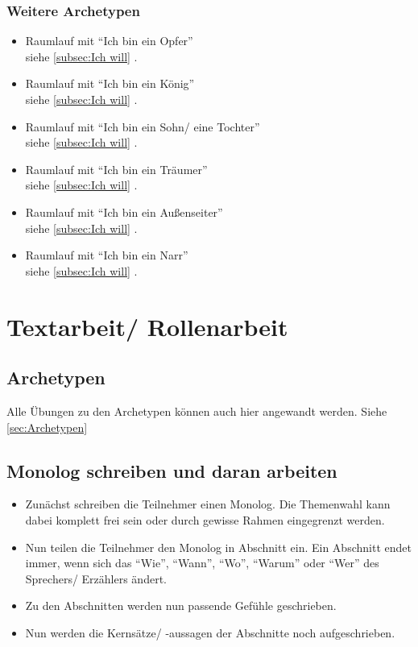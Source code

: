 \documentclass[ngerman, a4paper, twoside]{scrbook}%
\begin{document}
	\subsubsection{Weitere Archetypen}
	\begin{itemize}
		\item Raumlauf mit "`Ich bin ein Opfer"'\\
			siehe \ref{subsec:Ich will} .
		\item Raumlauf mit "`Ich bin ein König"'\\
		siehe \ref{subsec:Ich will} .
		\item Raumlauf mit "`Ich bin ein Sohn/ eine Tochter"'\\
			siehe \ref{subsec:Ich will} .
		\item Raumlauf mit "`Ich bin ein Träumer"'\\
			siehe \ref{subsec:Ich will} .
		\item Raumlauf mit "`Ich bin ein Außenseiter"'\\
			siehe \ref{subsec:Ich will} .
		\item Raumlauf mit "`Ich bin ein Narr"'\\
			siehe \ref{subsec:Ich will} .
	\end{itemize}




	\section{Textarbeit/ Rollenarbeit}
	\subsection{Archetypen}
	Alle Übungen zu den Archetypen können auch hier angewandt werden. Siehe \ref{sec:Archetypen} 
	\subsection{Monolog schreiben und daran arbeiten}
	\begin{itemize}
		\item Zunächst schreiben die Teilnehmer einen Monolog. Die Themenwahl kann dabei komplett frei sein oder durch gewisse Rahmen eingegrenzt werden.
		\item Nun teilen die Teilnehmer den Monolog in Abschnitt ein. Ein Abschnitt endet immer, wenn sich das "`Wie"', "`Wann"', "`Wo"', "`Warum"' oder "`Wer"' des Sprechers/ Erzählers ändert.
		\item Zu den Abschnitten werden nun passende Gefühle geschrieben.
		\item Nun werden die Kernsätze/ -aussagen der Abschnitte noch aufgeschrieben.
	\end{itemize}
\end{document}
